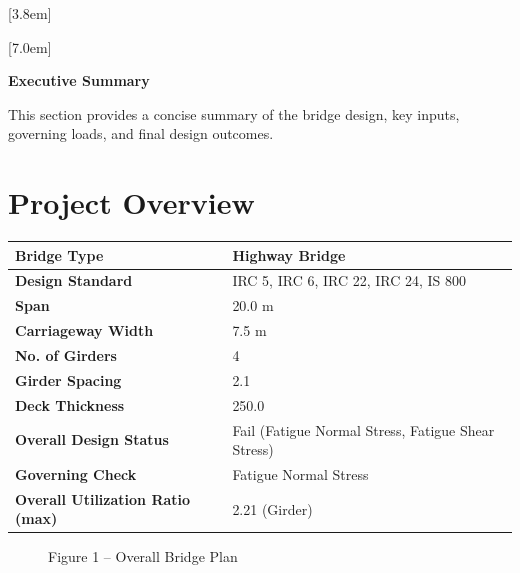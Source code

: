 \documentclass[12pt,a4paper]{report}
\numberwithin{table}{chapter}
\numberwithin{figure}{chapter}
\begin{document}
[3.8em]
  {\normalfont}
  {\contentslabel{2.3em}}
  {\hspace*{-2.3em}}
  {\hfill\contentspage}

[7.0em]
  {\normalfont}
  {\contentslabel{3.2em}}
  {\hspace*{-3.2em}}
  {\hfill\contentspage}

\newpage
\renewcommand{\contentsname}{\centering\Large\bfseries Table of Contents}
\tableofcontents


\newpage
{\centering\Large\bfseries Executive Summary\par}
\vspace{0.8em}

This section provides a concise summary of the bridge design, key inputs, governing loads, and final design outcomes.

\section*{Project Overview}
\label{sec:project-overview}


\begin{tabular}{|L{5.5cm}|L{8.5cm}|}
\hline
\textbf{Bridge Type} & Highway Bridge \\
\hline
\textbf{Design Standard} & IRC 5, IRC 6, IRC 22, IRC 24, IS 800 \\
\hline
\textbf{Span} & 20.0 m \\
\hline
\textbf{Carriageway Width} & 7.5 m \\
\hline
\textbf{No. of Girders} & 4 \\
\hline
\textbf{Girder Spacing} & 2.1 \\
\hline
\textbf{Deck Thickness} & 250.0 \\
\hline
\textbf{Overall Design Status} & Fail (Fatigue Normal Stress, Fatigue Shear Stress) \\
\hline
\textbf{Governing Check} & Fatigue Normal Stress \\
\hline
\textbf{Overall Utilization Ratio (max)} & 2.21 (Girder) \\
\hline
\end{tabular}


\begin{figure}[H]
\centering
{}
\caption*{Figure 1 -- Overall Bridge Plan}
\end{figure}
\end{document}
